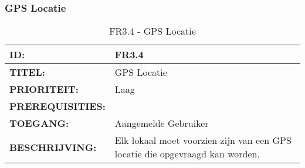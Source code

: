 \subsubsection{GPS Locatie} 
\noindent\begin{table}[H]
            \begin{tabular}{l | p{10cm}}
                \textbf{ID:} & FR3.4 \\ \hline
                \textbf{TITEL:} & GPS Locatie\\ \hline
                \textbf{PRIORITEIT:} &  Laag \\ \hline
                \textbf{PREREQUISITIES:} & \\ \hline
                \textbf{TOEGANG:} & Aangemelde Gebruiker \\ \hline
                \textbf{BESCHRIJVING:} & Elk lokaal moet voorzien zijn van een GPS locatie die opgevraagd kan worden.\\ 
            \end{tabular}\\
            \caption{FR3.4 - GPS Locatie}
            \label{tab:FR3.4 - GPS Locatie}
        \end{table}
\clearpage